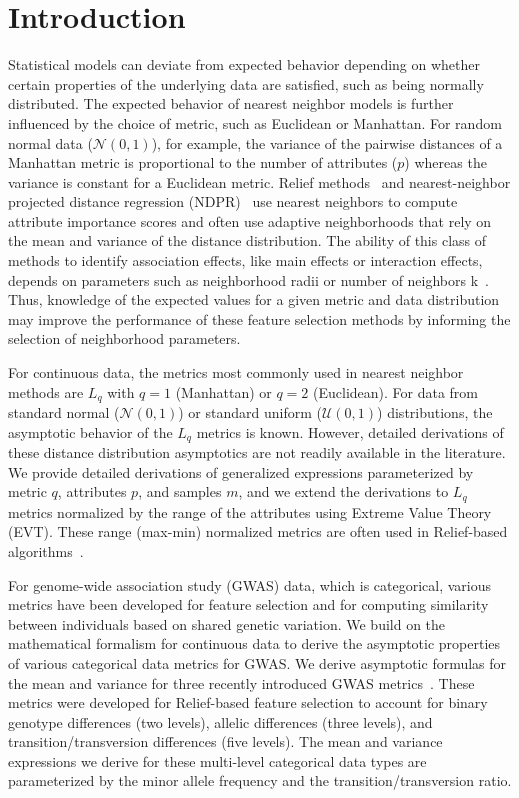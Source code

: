 \documentclass[aos]{imsart}
\begin{document}
\section*{Introduction}
Statistical models can deviate from expected behavior depending on whether certain properties of the underlying data are satisfied, such as being normally distributed. The expected behavior of nearest neighbor models is further influenced by the choice of metric, such as Euclidean or Manhattan. For random normal data ($\mathcal{N}(0,1)$), for example, the variance of the pairwise distances of a Manhattan metric is proportional to the number of attributes ($p$) whereas the variance is constant for a Euclidean metric. Relief methods~\cite{urbanowicz17,urbanowicz17b,robnik2003} and nearest-neighbor projected distance regression (NDPR)~\cite{npdr} use nearest neighbors to compute attribute importance scores and often use adaptive neighborhoods that rely on the mean and variance of the distance distribution. The ability of this class of methods to identify association effects, like main effects or interaction effects, depends on parameters such as neighborhood radii or number of neighbors k~\cite{stir,mckinney13}. Thus, knowledge of the expected values for a given metric and data distribution may improve the performance of these feature selection methods by informing the selection of neighborhood parameters. 

For continuous data, the metrics most commonly used in nearest neighbor methods are $L_q$ with $q=1$ (Manhattan) or $q=2$ (Euclidean). For data from standard normal ($\mathcal{N}(0,1)$) or standard uniform ($\mathcal{U}(0,1)$) distributions, the asymptotic behavior of the $L_q$ metrics is known. However, detailed derivations of these distance distribution asymptotics are not readily available in the literature. We provide detailed derivations of generalized expressions parameterized by metric $q$, attributes $p$, and samples $m$, and we extend the derivations to $L_q$ metrics normalized by the range of the attributes using Extreme Value Theory (EVT). These range (max-min) normalized metrics are often used in Relief-based algorithms~\cite{robnik2003}. 

For genome-wide association study (GWAS) data, which is categorical, various metrics have been developed for feature selection and for computing similarity between individuals based on shared genetic variation. We build on the mathematical formalism for continuous data to derive the asymptotic properties of various categorical data metrics for GWAS. We derive asymptotic formulas for the mean and variance for three recently introduced GWAS metrics~\cite{arabnejad2018}. These metrics were developed for Relief-based feature selection to account for binary genotype differences (two levels), allelic differences (three levels), and transition/transversion differences (five levels). The mean and variance expressions we derive for these multi-level categorical data types are parameterized by the minor allele frequency and the transition/transversion ratio. 
\end{document}

